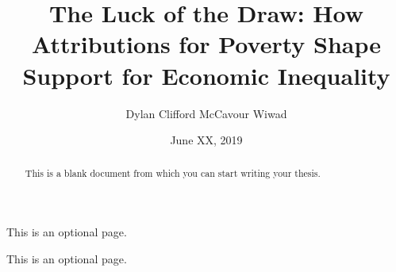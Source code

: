 \documentclass{sfuthesis}
\title{The Luck of the Draw: How Attributions for Poverty Shape Support for Economic Inequality}
\author{Dylan Clifford McCavour Wiwad}
\date{June XX, 2019}
\begin{document}
\frontmatter
\maketitle{}
\makecommittee{}

%
%
\clearpage

\begin{abstract}
	This is a blank document from which you can start writing your thesis.
\end{abstract}


\begin{dedication}
	This is an optional page.
\end{dedication}

\begin{acknowledgements}
	This is an optional page.
\end{acknowledgements}

%
\tableofcontents%
\clearpage

%
\listoftables%
\clearpage

%
\listoffigures%
\clearpage
\end{document}
